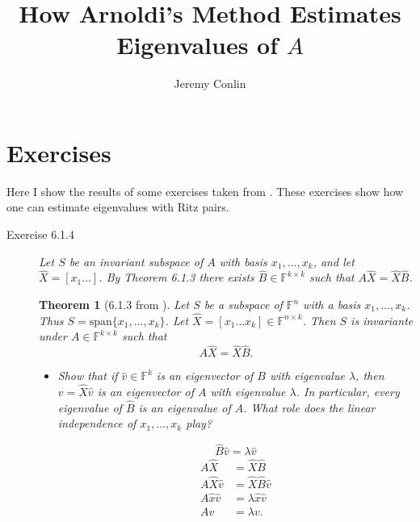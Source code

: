 \documentclass[10pt]{article}
\author{Jeremy Conlin}
\title{How Arnoldi's Method Estimates Eigenvalues of $A$}
\newtheorem{thm}{Theorem}[section]
\begin{document}
\maketitle
{}

\section{Exercises}
Here I show the results of some exercises taken from \cite{Watkins2002:Funda}.  These exercises show how one can estimate eigenvalues with Ritz pairs.
\begin{description}
    \item[Exercise 6.1.4]\emph{Let $S$ be an invariant subspace of $A$ with basis $x_1, \ldots , x_k$, and let $\hat{X} = [x_1 \ldots]$.  By Theorem 6.1.3 there exists $\hat{B} \in \mathbb{F}^{k \times k}$ such that $A\hat{X} = \hat{X}\hat{B}$.}

    \begin{thm}[6.1.3 from \cite{Watkins2002:Funda}]
    Let $S$ be a subspace of $\mathbb{F}^n$ with a basis $x_1, \ldots , x_k$.  Thus $S = \mathrm{span}\{x_1, \ldots , x_k\}$.  Let $\hat{X} = [x_1 \ldots x_k] \in \mathbb{F}^{n\times k}$. Then $S$ is invariante under $A \in \mathbb{F}^{k \times k}$ such that 
    \begin{equation}
        A\hat{X} = \hat{X}\hat{B}.
    \end{equation}
    \end{thm}

    \begin{itemize}[\textbf{Part }\bfseries a)]
    \item \emph{Show that if $\hat{v} \in \mathbb{F}^k$ is an eigenvector of $B$ with eigenvalue $\lambda$, then $v = \hat{X}\hat{v}$ is an eigenvector of $A$ with eigenvalue $\lambda$.  In particular, every eigenvalue of $\hat{B}$ is an eigenvalue of $A$.  What role does the linear independence of $x_1, \ldots , x_k$ play?}

    \begin{equation}
        \hat{B}\hat{v} = \lambda\hat{v}
    \end{equation}
    \begin{subequations}\begin{align}
        A\hat{X} &= \hat{X}\hat{B} \\
        A\hat{X}\hat{v} &= \hat{X}\hat{B}\hat{v} \\
        A\hat{x}\hat{v} &= \lambda \hat{x}\hat{v} \\[4mm]
        Av &= \lambda v.
    \end{align}\end{subequations}


\end{itemize}
\end{description}
\end{document}
